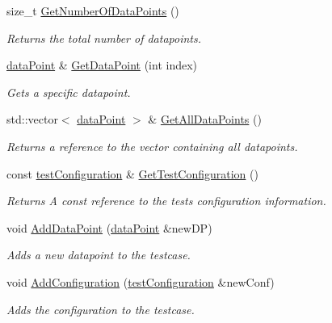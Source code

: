 \begin{DoxyCompactItemize}
\item 
size\+\_\+t \mbox{\hyperlink{classtestAnalyser2_1_1TestFile_ae626148fab71cd482ab642d555421495}{Get\+Number\+Of\+Data\+Points}} ()
\begin{DoxyCompactList}\small\item\em Returns the total number of datapoints. \end{DoxyCompactList}\item 
\mbox{\hyperlink{structtestAnalyser2_1_1dataPoint}{data\+Point}} \& \mbox{\hyperlink{classtestAnalyser2_1_1TestFile_a36b227c43962158aa86e17cf888fe515}{Get\+Data\+Point}} (int index)
\begin{DoxyCompactList}\small\item\em Gets a specific datapoint. \end{DoxyCompactList}\item 
std\+::vector$<$ \mbox{\hyperlink{structtestAnalyser2_1_1dataPoint}{data\+Point}} $>$ \& \mbox{\hyperlink{classtestAnalyser2_1_1TestFile_a547b149d49429a2124245c7e2dccf6e7}{Get\+All\+Data\+Points}} ()
\begin{DoxyCompactList}\small\item\em Returns a reference to the vector containing all datapoints. \end{DoxyCompactList}\item 
const \mbox{\hyperlink{structtestAnalyser2_1_1testConfiguration}{test\+Configuration}} \& \mbox{\hyperlink{classtestAnalyser2_1_1TestFile_a1c5053e9521ad606e2c1361db7c30b70}{Get\+Test\+Configuration}} ()
\begin{DoxyCompactList}\small\item\em Returns A const reference to the tests configuration information. \end{DoxyCompactList}\item 
void \mbox{\hyperlink{classtestAnalyser2_1_1TestFile_ab0d5ab55a41a9bf4f15f0eb10f945bd3}{Add\+Data\+Point}} (\mbox{\hyperlink{structtestAnalyser2_1_1dataPoint}{data\+Point}} \&new\+DP)
\begin{DoxyCompactList}\small\item\em Adds a new datapoint to the testcase. \end{DoxyCompactList}\item 
void \mbox{\hyperlink{classtestAnalyser2_1_1TestFile_aabedadfa43358f3069e0fe958d7582e7}{Add\+Configuration}} (\mbox{\hyperlink{structtestAnalyser2_1_1testConfiguration}{test\+Configuration}} \&new\+Conf)
\begin{DoxyCompactList}\small\item\em Adds the configuration to the testcase. \end{DoxyCompactList}\end{DoxyCompactItemize}


